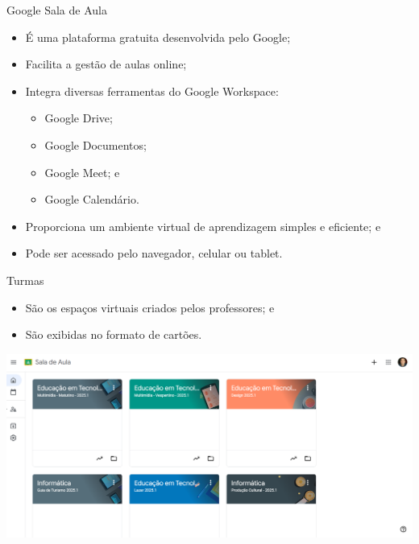 \documentclass[aspectratio=169]{beamer} %
\begin{document}
\begin{frame}{Google Sala de Aula}
	
	\begin{itemize}
		\item É uma plataforma gratuita desenvolvida pelo Google;
		\item Facilita a gestão de aulas online;
		\item Integra diversas ferramentas do Google Workspace:
		\begin{itemize}
			\item Google Drive;
			\item Google Documentos;
			\item Google Meet; e 
			\item Google Calendário.
		\end{itemize}
		\item Proporciona um ambiente virtual de aprendizagem simples e eficiente; e
		\item Pode ser acessado pelo navegador, celular ou tablet.
	\end{itemize}
\end{frame}

\begin{frame}{Turmas}
	
	\begin{itemize}
		\item São os espaços virtuais criados pelos professores; e
		\item São exibidas no formato de cartões.
	\end{itemize}\vfill
	
	\begin{center}
		\includegraphics[scale=0.2]{img/sga}
	\end{center}
\end{frame}
\end{document}
